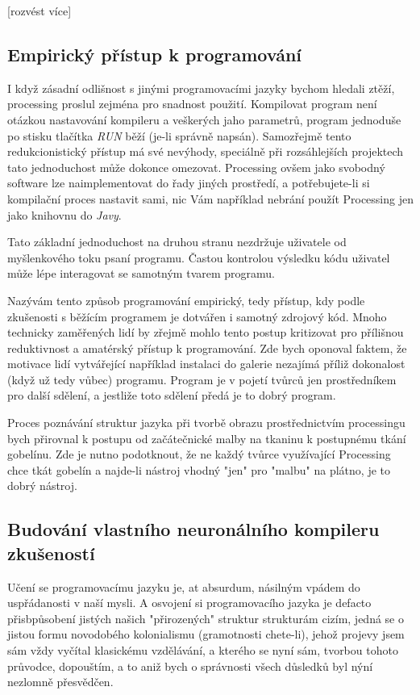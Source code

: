 \documentclass[11pt]{article}
\begin{document}
[rozvést více]

\subsection{Empirický přístup k programování}

	I když zásadní odlišnost s jinými programovacími jazyky bychom hledali ztěží, processing proslul zejména pro snadnost použití. Kompilovat program není otázkou nastavování kompileru a veškerých jaho parametrů, program jednoduše po stisku tlačítka {\em RUN} běží (je-li správně napsán). Samozřejmě tento redukcionistický přístup má své nevýhody, speciálně při rozsáhlejších projektech tato jednoduchost může dokonce omezovat. Processing ovšem jako svobodný software lze naimplementovat do řady jiných prostředí, a potřebujete-li si kompilační proces nastavit sami, nic Vám například nebrání použít Processing jen jako knihovnu do {\em Javy}.

Tato základní jednoduchost na druhou stranu nezdržuje uživatele od myšlenkového toku psaní programu. Častou kontrolou výsledku kódu uživatel může lépe interagovat se samotným tvarem programu.

Nazývám tento způsob programování empirický, tedy přístup, kdy podle zkušenosti s běžícím programem je dotvářen i samotný zdrojový kód. Mnoho technicky zaměřených lidí by zřejmě mohlo tento postup kritizovat pro přílišnou reduktivnost a amatérský přístup k programování. Zde bych oponoval faktem, že motivace lidí vytvářející například instalaci do galerie nezajímá příliž dokonalost (když už tedy vůbec) programu. Program je v pojetí tvůrců jen prostředníkem pro další sdělení, a jestliže toto sdělení předá je to dobrý program.

Proces poznávání struktur jazyka při tvorbě obrazu prostřednictvím processingu bych přirovnal k postupu od začátečnické malby na tkaninu k postupnému tkání gobelínu. Zde je nutno podotknout, že ne každý tvůrce využívající Processing chce tkát gobelín a najde-li nástroj vhodný "jen" pro "malbu" na plátno, je to dobrý nástroj.

\subsection{Budování vlastního neuronálního kompileru zkušeností}



Učení se programovacímu jazyku je, at absurdum, násilným vpádem do uspřádanosti v naší mysli. A osvojení si programovacího jazyka je defacto přisbpůsobení jistých našich "přirozených" struktur strukturám cizím, jedná se o jistou formu novodobého kolonialismu (gramotnosti chete-li), jehož projevy jsem sám vždy vyčítal klasickému vzdělávání, a kterého se nyní sám, tvorbou tohoto průvodce, dopouštím, a to aniž bych o správnosti všech důsledků byl nýní nezlomně přesvědčen.
\end{document}
